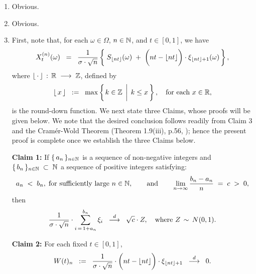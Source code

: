 \begin{enumerate}
\item	Obvious.
\item	Obvious.
\item	First, note that, for each $\omega \in \Omega$, $n \in\mathbb{N}$, and $t \in [0,1]$, we have
		\begin{equation*}
		X^{(n)}_{t}(\omega)
		\;\; = \;\;
		\dfrac{1}{\sigma\cdot\sqrt{n}}
		\left\{\;
		S_{\lfloor nt \rfloor}(\omega) \;+\; \left(\overset{{\color{white}1}}{nt} - \lfloor nt \rfloor\right)\cdot\xi_{\lfloor nt \rfloor+1}(\omega)
		\,\right\},
		\end{equation*}
		where $\lfloor\,\cdot\,\rfloor\,:\,\mathbb{R}\;\longrightarrow\;\mathbb{Z}$, defined by
		\begin{equation*}
		\lfloor\,x\,\rfloor
		\;\;:=\;\;
		\max\left\{
		\left. k \in \overset{{\color{white}1}}{\Z} \,\;\right\vert\; k \leq x
		\,\right\},
		\quad
		\textnormal{for each $x \in \Re$},
		\end{equation*}
		is the round-down function.
		We next state three Claims, whose proofs will be given below.
		We note that the desired conclusion follows readily from Claim 3 and
		the Cram\'{e}r-Wold Theorem (Theorem 1.9(iii), p.56, \cite{Shao2003});
		hence the present proof is complete once we establish the three
		Claims below.

		\vskip 0.5cm
		\begin{center}
		\begin{minipage}{6.0in}
		\noindent
		\textbf{Claim 1:}\quad
		If \;$\{\,a_{n}\,\}_{n\in\mathbb{N}}$\; is a sequence of non-negative integers and
		\;$\{\,b_{n}\,\}_{n\in\mathbb{N}} \;\subset\; \mathbb{N}$\; a sequence of positive integers
		satisfying:
		\begin{equation*}
		a_{n} \;<\; b_{n}, \;\textnormal{for sufficiently large $n\in\mathbb{N}$},
		\quad\quad
		\textnormal{and}
		\quad\quad
		\lim_{n\rightarrow\infty}\dfrac{b_{n} - a_{n}}{n} \;=\; c \;>\; 0,
		\end{equation*}
		then
		\begin{equation*}
		\dfrac{1}{\sigma\cdot\sqrt{n}}\cdot\sum_{i\,=\,1+a_{n}}^{b_{n}}\xi_{i}
		\;\; \overset{d}{\longrightarrow} \;\;
		\sqrt{c}\cdot Z,
		\quad
		\textnormal{where $Z\,\sim\,N(0,1)$}.
		\end{equation*}
		\end{minipage}
		\end{center}

		\vskip 0.5cm
		\begin{center}
		\begin{minipage}{6.0in}
		\noindent
		\textbf{Claim 2:}
		\quad For each fixed $t \in [0,1]$,
		\begin{equation*}
		W(t)_{n} \;\; := \;\;
		\dfrac{1}{\sigma\cdot\sqrt{n}}
		\cdot
		\left(\overset{{\color{white}1}}{nt} - \lfloor nt \rfloor\right)
		\cdot
		\xi_{\lfloor nt \rfloor + 1}
		\;\; \overset{d}{\longrightarrow} \;\;
		0.
		\end{equation*}
		\end{minipage}
		\end{center}


\end{enumerate}
